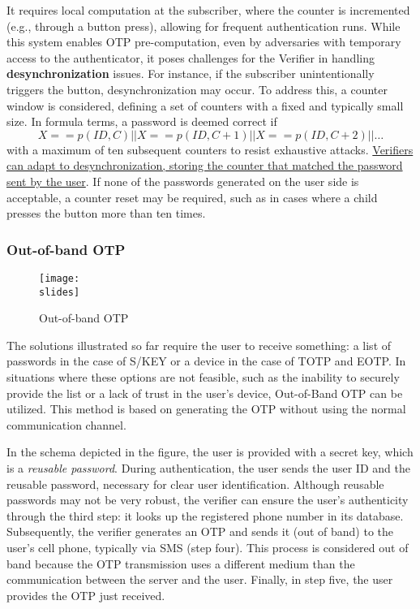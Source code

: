 It requires local computation at the subscriber, where the counter is incremented (e.g., through a button press), allowing for frequent authentication runs.
While this system enables OTP pre-computation, even by adversaries with temporary access to the authenticator, it poses challenges for the Verifier in handling \textbf{desynchronization} issues. For instance, if the subscriber unintentionally triggers the button, desynchronization may occur.
To address this, a counter window is considered, defining a set of counters with a fixed and typically small size. In formula terms, a password is deemed correct if
\[
  X == p(ID, C) || X == p(ID, C + 1) || X == p(ID, C + 2) || \ldots
\]
with a maximum of ten subsequent counters to resist exhaustive attacks.
\ul{Verifiers can adapt to desynchronization, storing the counter that matched the password sent by the user}.
If none of the passwords generated on the user side is acceptable, a counter reset may be required, such as in cases where a child presses the button more than ten times.


\subsubsection{Out-of-band OTP}
\begin{figure}[h]
  \centering
  \texttt{[image: \\slides]}
  \caption{Out-of-band OTP}
\end{figure}

The solutions illustrated so far require the user to receive something: a list of passwords in the case of S/KEY or a device in the case of TOTP and EOTP. In situations where these options are not feasible, such as the inability to securely provide the list or a lack of trust in the user's device, Out-of-Band OTP can be utilized. This method is based on generating the OTP without using the normal communication channel.

In the schema depicted in the figure, the user is provided with a secret key, which is a \textit{reusable password}. During authentication, the user sends the user ID and the reusable password, necessary for clear user identification. Although reusable passwords may not be very robust, the verifier can ensure the user's authenticity through the third step: it looks up the registered phone number in its database. Subsequently, the verifier generates an OTP and sends it (out of band) to the user's cell phone, typically via SMS (step four). This process is considered out of band because the OTP transmission uses a different medium than the communication between the server and the user. Finally, in step five, the user provides the OTP just received.

